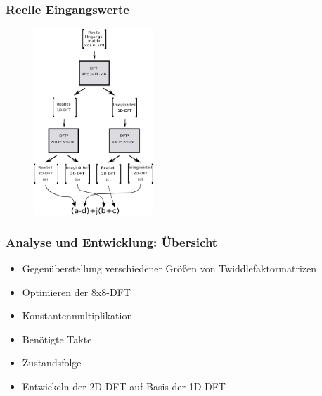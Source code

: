 \begin{frame}\frametitle{Reelle Eingangswerte}
 \begin{figure}[htbp]
 \centering
   \includegraphics[width=0.4\textwidth]{img/reelleMatMult.png}
 \label{pic:reelleDFT}
\end{figure}
\end{frame}


\begin{frame}\frametitle{Analyse und Entwicklung: Übersicht}
 \begin{itemize}
  \item Gegenüberstellung verschiedener Größen von Twiddlefaktormatrizen
  \item Optimieren der 8x8-DFT
  \item Konstantenmultiplikation
  \item Benötigte Takte
  \item Zustandsfolge
  \item Entwickeln der 2D-DFT auf Basis der 1D-DFT
 \end{itemize}

\end{frame}



